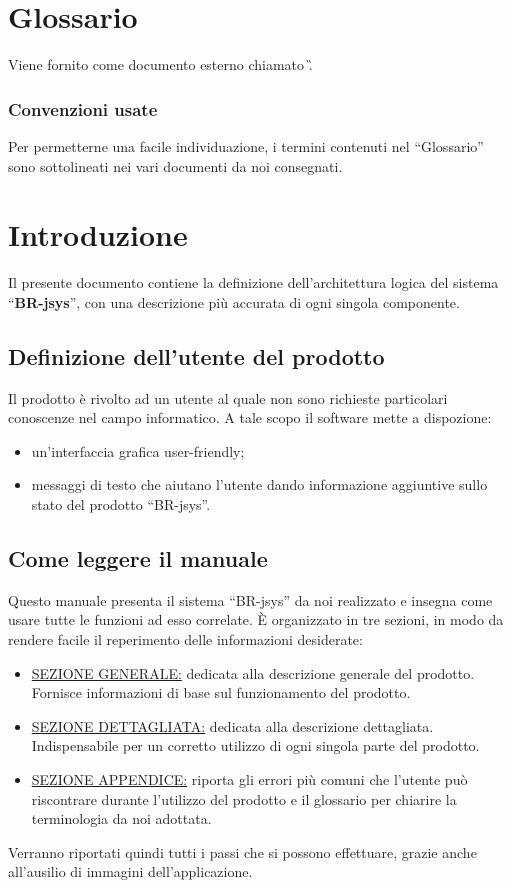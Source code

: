 \chapter*{Glossario}
Viene fornito come documento esterno chiamato \G. 
\subsection{Convenzioni usate}
Per permetterne una facile individuazione, i termini contenuti nel ``Glossario'' sono sottolineati nei vari documenti da noi consegnati.

\chapter{Introduzione}
Il presente documento contiene la definizione dell'architettura logica del sistema ``\textbf{BR-jsys}'', con una descrizione pi\`u accurata di ogni singola componente.
\section{Definizione dell'utente del prodotto}
Il prodotto \`e rivolto ad un utente al quale non sono richieste particolari conoscenze nel campo informatico. A tale scopo il software mette a dispozione:
\begin{itemize}
\item un'interfaccia grafica user-friendly;
\item messaggi di testo che aiutano l'utente dando informazione aggiuntive sullo stato del prodotto ``BR-jsys''.
\end{itemize}
\section{Come leggere il manuale}
Questo manuale presenta il sistema ``BR-jsys'' da noi realizzato e insegna come usare tutte le funzioni ad esso correlate. \`E organizzato in tre sezioni, in modo da rendere facile il reperimento delle informazioni desiderate:
\begin{itemize}
\item \underline{SEZIONE GENERALE:} dedicata alla descrizione generale del prodotto. Fornisce informazioni di base sul funzionamento del prodotto.
\item \underline{SEZIONE DETTAGLIATA:} dedicata alla descrizione dettagliata. Indispensabile per un corretto utilizzo di ogni singola parte del prodotto.
\item \underline{SEZIONE APPENDICE:} riporta gli errori pi\`u comuni che l'utente pu\`o riscontrare durante l'utilizzo del prodotto e il glossario per chiarire la terminologia da noi adottata.
\end{itemize}
Verranno riportati quindi tutti i passi che si possono effettuare, grazie anche all'ausilio di immagini dell'applicazione.
